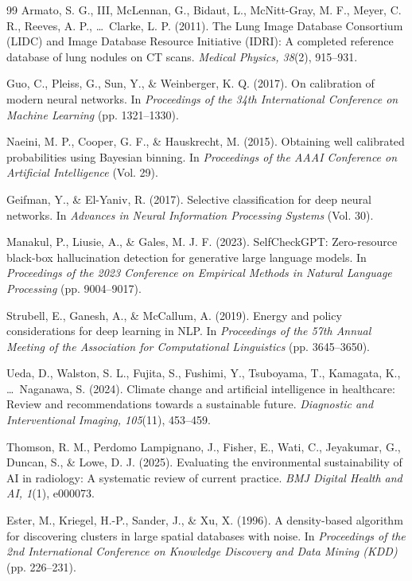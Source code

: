 \documentclass[12pt]{article}
\begin{document}
\begin{thebibliography}{99}
Armato, S. G., III, McLennan, G., Bidaut, L., McNitt-Gray, M. F., Meyer, C. R., Reeves, A. P., \ldots\ Clarke, L. P. (2011). The Lung Image Database Consortium (LIDC) and Image Database Resource Initiative (IDRI): A completed reference database of lung nodules on CT scans. \textit{Medical Physics, 38}(2), 915--931.

Guo, C., Pleiss, G., Sun, Y., \& Weinberger, K. Q. (2017). On calibration of modern neural networks. In \textit{Proceedings of the 34th International Conference on Machine Learning} (pp. 1321--1330).

Naeini, M. P., Cooper, G. F., \& Hauskrecht, M. (2015). Obtaining well calibrated probabilities using Bayesian binning. In \textit{Proceedings of the AAAI Conference on Artificial Intelligence} (Vol. 29).

Geifman, Y., \& El-Yaniv, R. (2017). Selective classification for deep neural networks. In \textit{Advances in Neural Information Processing Systems} (Vol. 30).

Manakul, P., Liusie, A., \& Gales, M. J. F. (2023). SelfCheckGPT: Zero-resource black-box hallucination detection for generative large language models. In \textit{Proceedings of the 2023 Conference on Empirical Methods in Natural Language Processing} (pp. 9004--9017).

Strubell, E., Ganesh, A., \& McCallum, A. (2019). Energy and policy considerations for deep learning in NLP. In \textit{Proceedings of the 57th Annual Meeting of the Association for Computational Linguistics} (pp. 3645--3650).

Ueda, D., Walston, S. L., Fujita, S., Fushimi, Y., Tsuboyama, T., Kamagata, K., \ldots\ Naganawa, S. (2024). Climate change and artificial intelligence in healthcare: Review and recommendations towards a sustainable future. \textit{Diagnostic and Interventional Imaging, 105}(11), 453--459.

Thomson, R. M., Perdomo Lampignano, J., Fisher, E., Wati, C., Jeyakumar, G., Duncan, S., \& Lowe, D. J. (2025). Evaluating the environmental sustainability of AI in radiology: A systematic review of current practice. \textit{BMJ Digital Health and AI, 1}(1), e000073.

Ester, M., Kriegel, H.-P., Sander, J., \& Xu, X. (1996). A density-based algorithm for discovering clusters in large spatial databases with noise. In \textit{Proceedings of the 2nd International Conference on Knowledge Discovery and Data Mining (KDD)} (pp. 226--231).


\end{thebibliography}
\end{document}
